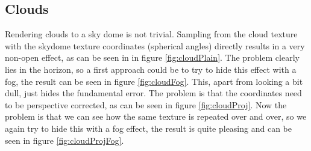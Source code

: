 \documentclass{article}
\begin{document}
\subsection{Clouds} \label{sec:clouds}
Rendering clouds to a sky dome is not trivial. Sampling from the cloud texture with the skydome texture coordinates (spherical angles) directly results in a very non-open effect, as can be seen in in figure \ref{fig:cloudPlain}.
The problem clearly lies in the horizon, so a first approach could be to try to hide this effect with a fog, the result can be seen in figure \ref{fig:cloudFog}. This, apart from looking a bit dull, just hides the fundamental error.
The problem is that the coordinates need to be perspective corrected, as can be seen in figure \ref{fig:cloudProj}.
Now the problem is that we can see how the same texture is repeated over and over, so we again try to hide this with a fog effect, the result is quite pleasing and can be seen in figure \ref{fig:cloudProjFog}.
\end{document}
